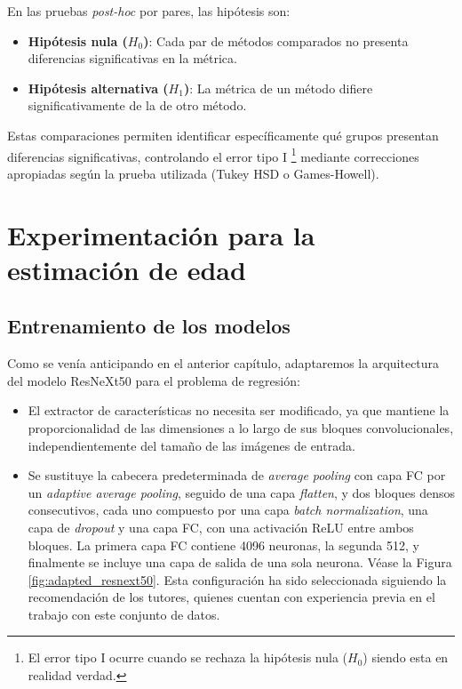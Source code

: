 En las pruebas \textit{post-hoc} por pares, las hipótesis son:

\begin{itemize}
    \item \textbf{Hipótesis nula ($H_0$)}: Cada par de métodos comparados no presenta diferencias significativas en la métrica.
    \item \textbf{Hipótesis alternativa ($H_1$)}: La métrica de un método difiere significativamente de la de otro método.
\end{itemize}

Estas comparaciones permiten identificar específicamente qué grupos presentan diferencias significativas, controlando el error tipo I%
\footnote{El error tipo I ocurre cuando se rechaza la hipótesis nula ($H_0$) siendo esta en realidad verdad.} mediante correcciones apropiadas según la prueba utilizada (Tukey HSD o Games-Howell).


\section{Experimentación para la estimación de edad}


\subsection{Entrenamiento de los modelos}

Como se venía anticipando en el anterior capítulo, adaptaremos la arquitectura del modelo ResNeXt50 para el problema de regresión:

\begin{itemize}
    \item El extractor de características no necesita ser modificado, ya que mantiene la proporcionalidad de las dimensiones a lo largo de sus bloques convolucionales, independientemente del tamaño de las imágenes de entrada.
    \item Se sustituye la cabecera predeterminada de \textit{average pooling} con capa \acrshort{FC} por un \textit{adaptive average pooling}, seguido de una capa \textit{flatten}, y dos bloques densos consecutivos, cada uno compuesto por una capa \textit{batch normalization}, una capa de \textit{dropout} y una capa \acrshort{FC}, con una activación ReLU entre ambos bloques. La primera capa \acrshort{FC} contiene 4096 neuronas, la segunda 512, y finalmente se incluye una capa de salida de una sola neurona. Véase la Figura \ref{fig:adapted_resnext50}. Esta configuración ha sido seleccionada siguiendo la recomendación de los tutores, quienes cuentan con experiencia previa en el trabajo con este conjunto de datos.
\end{itemize}


